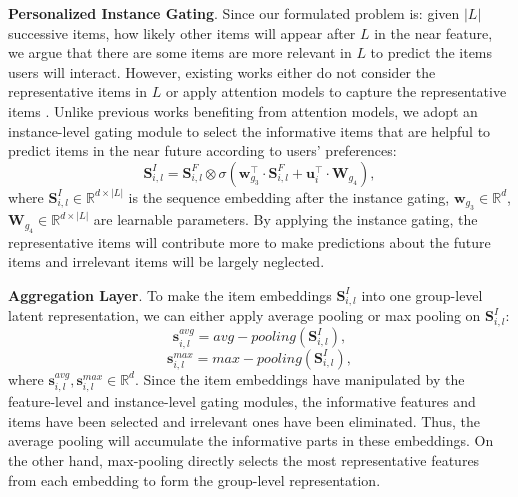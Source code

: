 \documentclass[sigconf]{acmart}
\makeatletter
\def\subsubsection{\@startsection{subsubsection}{3}\z@{.3\linespacing\@plus.7\linespacing}{.1\linespacing}{\normalfont\itshape}}
\makeatother
\begin{document}
\subsubsection{Instance Gating}
\textbf{Personalized Instance Gating}. Since our formulated problem is: given $ |L| $ successive items, how likely other items will appear after $ L $ in the near feature, we argue that there are some items are more relevant in $ L $ to predict the items users will interact. However, existing works either do not consider the representative items in $ L $ \cite{DBLP:conf/wsdm/TangW18,DBLP:conf/cikm/HidasiK18} or apply attention models to capture the representative items \cite{DBLP:conf/cikm/LiRCRLM17,DBLP:conf/icdm/KangM18}. Unlike previous works benefiting from attention models, we adopt an instance-level gating module to select the informative items that are helpful to predict items in the near future according to users' preferences:
\begin{equation}
\mathbf{S}^{I}_{i,l} = \mathbf{S}^{F}_{i,l} \otimes \sigma(\mathbf{w}_{g_3}^{\top} \cdot \mathbf{S}^{F}_{i,l} + \mathbf{u}_{i}^{\top} \cdot \mathbf{W}_{g_4}),
\end{equation}
where $ \mathbf{S}^{I}_{i,l} \in \mathbb{R}^{d \times |L|} $ is the sequence embedding after the instance gating, $ \mathbf{w}_{g_3} \in \mathbb{R}^{d} $, $ \mathbf{W}_{g_4} \in \mathbb{R}^{d \times |L|} $ are learnable parameters. By applying the instance gating, the representative items will contribute more to make predictions about the future items and irrelevant items will be largely neglected.

\textbf{Aggregation Layer}. To make the item embeddings $ \mathbf{S}^{I}_{i,l} $ into one group-level latent representation, we can either apply average pooling or max pooling on $ \mathbf{S}^{I}_{i,l} $:
\begin{equation}
\mathbf{s}_{i,l}^{avg} = avg-pooling(\mathbf{S}^{I}_{i,l}),
\end{equation}
\begin{equation}
\mathbf{s}_{i,l}^{max} = max-pooling(\mathbf{S}^{I}_{i,l}),
\end{equation}
where $ \mathbf{s}_{i,l}^{avg}, \mathbf{s}_{i,l}^{max} \in \mathbb{R}^{d} $. Since the item embeddings have manipulated by the feature-level and instance-level gating modules, the informative features and items have been selected and irrelevant ones have been eliminated. Thus, the average pooling will accumulate the informative parts in these embeddings. On the other hand, max-pooling directly selects the most representative features from each embedding to form the group-level representation.
\end{document}
